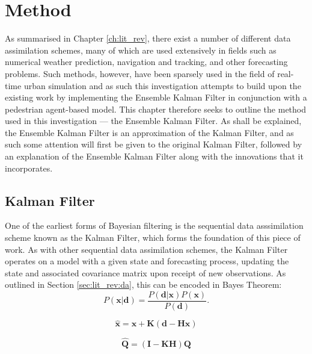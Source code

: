 \chapter{Method}\label{ch:method}

As summarised in Chapter \ref{ch:lit_rev}, there exist a number of different
data assimilation schemes, many of which are used extensively in fields such as
numerical weather prediction, navigation and tracking, and other forecasting
problems.
Such methods, however, have been sparsely used in the field of real-time urban
simulation and as such this investigation attempts to build upon the existing
work by implementing the Ensemble Kalman Filter in conjunction with a pedestrian
agent-based model.
This chapter therefore seeks to outline the method used in this investigation --- the
Ensemble Kalman Filter. 
As shall be explained, the Ensemble Kalman Filter is an approximation of the
Kalman Filter, and as such some attention will first be given to the original
Kalman Filter, followed by an explanation of the Ensemble Kalman Filter along
with the innovations that it incorporates.

\section{Kalman Filter}\label{sec:method:kf}

One of the earliest forms of Bayesian filtering is the sequential data
asssimilation scheme known as the Kalman Filter, which forms the foundation of
this piece of work.
As with other sequential data assimilation schemes, the Kalman Filter operates
on a model with a given state and forecasting process, updating the state and
associated covariance matrix upon receipt of new observations.
As outlined in Section \ref{sec:lit_rev:da}, this can be encoded in Bayes
Theorem:
\begin{equation}
    P \left( \mathbf{x} | \mathbf{d} \right) = 
    \frac{P ( \mathbf{d} | \mathbf{x} ) P ( \mathbf{x} )}{P ( \mathbf{d} ) }.
\end{equation}

\begin{equation}
    \hat{\mathbf{x}} = \mathbf{x} + \mathbf{K} \left(
                        \mathbf{d} - \mathbf{H} \mathbf{x} \right)
\end{equation}

\begin{equation}
    \hat{\mathbf{Q}} = \left( \mathbf{I} - \mathbf{K} \mathbf{H} \right)
                        \mathbf{Q}
\end{equation}

